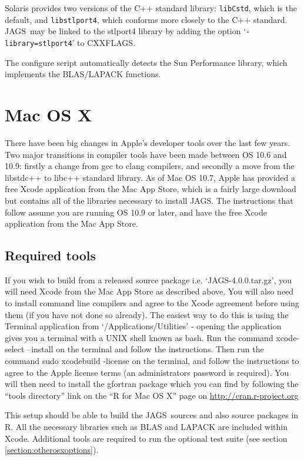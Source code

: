 \documentclass[11pt, a4paper, titlepage]{article}
\newcommand{\release}{4.0.0}
\newcommand{\JAGS}{\textsf{JAGS}}
\newcommand{\code}[1]{{\bgroup{\normalfont\ttfamily #1}\egroup}}
\newcommand{\samp}[1]{{`\bgroup\normalfont\texttt{#1}'\egroup}}
\newcommand{\file}[1]{{`\normalfont\textsf{#1}'}}
\let\option=\samp
\begin{document}
Solaris provides two versions of the C++ standard library:
\texttt{libCstd}, which is the default, and \texttt{libstlport4},
which conforms more closely to the C++ standard. \JAGS\ may be linked
to the stlport4 library by adding the option
\option{-library=stlport4} to \code{CXXFLAGS}. 

The configure script automatically detects the Sun Performance library,
which implements the BLAS/LAPACK functions.  

\clearpage
\section{Mac OS X}

There have been big changes in Apple's developer tools over the last few
years.  Two major transitions in compiler tools have been made between
OS 10.6 and 10.9: firstly a change from gcc to clang compilers, and
secondly a move from the libstdc++ to libc++ standard library.  As of
Mac OS 10.7, Apple has provided a free Xcode application from the Mac
App Store, which is a fairly large download but contains all of the libraries
necessary to install \JAGS. The instructions that follow assume you are 
running OS 10.9 or later, and have the free Xcode application from the 
Mac App Store.

\subsection{Required tools}

If you wish to build from a released source package i.e.
\file{JAGS-\release.tar.gz}, you will need Xcode from the Mac App Store
as described above.  You will also need to install command line compilers
and agree to the Xcode agreement before using them (if you have not
done so already). The easiest way to do this is using the Terminal
application from \file{/Applications/Utilities} - opening the
application gives you a terminal with a UNIX shell known as bash.  Run
the command \code{xcode-select --install} on the terminal and follow the
instructions.  Then run the command \code{sudo xcodebuild -license} 
on the terminal, and follow the instructions to agree to the Apple
license terms (an administrators password is required).  You will then
need to install the gfortran package which you can find by following the
``tools directory'' link on the ``R for Mac OS X'' page on
\url{http://cran.r-project.org}

This setup should be able to build the \JAGS\ sources and also source
packages in R.  All the necessary libraries such as BLAS and LAPACK are
included within Xcode.  Additional tools are required to run the optional 
test suite (see section \ref{section:otherosxoptions}).
\end{document}
